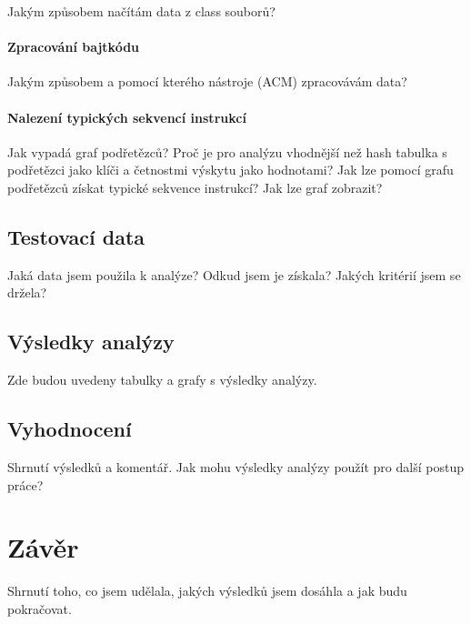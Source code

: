 Jakým způsobem načítám data z class souborů?

\subsubsection{Zpracování bajtkódu}

Jakým způsobem a pomocí kterého nástroje (ACM) zpracovávám data?

\subsubsection{Nalezení typických sekvencí instrukcí}

Jak vypadá graf podřetězců? Proč je pro analýzu vhodnější než hash tabulka s podřetězci jako klíči a četnostmi výskytu jako hodnotami?
Jak lze pomocí grafu podřetězců získat typické sekvence instrukcí? Jak lze graf zobrazit?

\section{Testovací data}

Jaká data jsem použila k analýze? Odkud jsem je získala? Jakých kritérií jsem se držela?

\section{Výsledky analýzy}

Zde budou uvedeny tabulky a grafy s výsledky analýzy.

\section{Vyhodnocení}

Shrnutí výsledků a komentář. Jak mohu výsledky analýzy použít pro další postup práce?


\chapter{Závěr}

Shrnutí toho, co jsem udělala, jakých výsledků jsem dosáhla a jak budu pokračovat.

